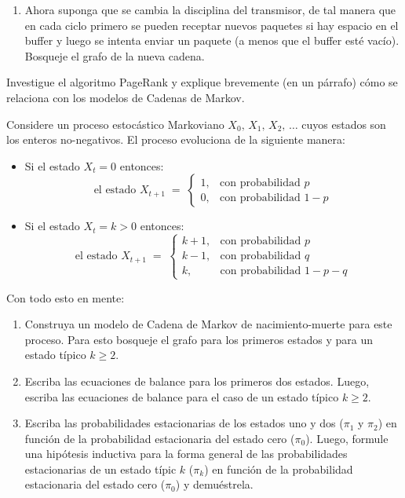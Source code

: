 \documentclass[ a4paper, twoside, 11pt]{article}
\begin{document}
\begin{problem}
\begin{enumerate}[label=\textbf{\alph*)}]
\item Ahora suponga que se cambia la disciplina del transmisor, de tal manera que en cada ciclo primero se pueden receptar nuevos paquetes si hay espacio en el buffer y luego se intenta enviar un paquete (a menos que el buffer est\'e vac\'io). Bosqueje el grafo de la nueva cadena. 

\end{enumerate}

\end{problem}
\fullskip

\begin{problem}
Investigue el algoritmo PageRank y explique brevemente (\eg en un p\'arrafo) c\'omo se relaciona con los modelos de Cadenas de Markov. \QED

\end{problem}
\fullskip

\begin{problem}
Considere un proceso estoc\'astico Markoviano $X_0, \, X_1, \, X_2,\, \dots$ cuyos estados son los enteros no-negativos. El proceso evoluciona de la siguiente manera: 
\begin{itemize}
\item Si el estado $X_t = 0$ entonces: 
\[
\text{el estado } X_{t+1} \; = \; 
\begin{cases}
1, & \text{con probabilidad } p \\
0, & \text{con probabilidad } 1-p 
\end{cases}
\]
\item Si el estado $X_t = k > 0$ entonces: 
\[
\text{el estado } X_{t+1} \; = \; 
\begin{cases}
k+1, & \text{con probabilidad } p \\
k-1, & \text{con probabilidad } q \\
k, & \text{con probabilidad } 1-p-q
\end{cases}
\]
\end{itemize}

Con todo esto en mente: 
\begin{enumerate}[label=\textbf{\alph*)}]
\item Construya un modelo de Cadena de Markov de nacimiento-muerte para este proceso. Para esto bosqueje el grafo para los primeros estados y para un estado t\'ipico $k \geq 2$. 
\item Escriba las ecuaciones de balance para los primeros dos estados. Luego, escriba las ecuaciones de balance para el caso de un estado t\'ipico $k \geq 2$. 
\item Escriba las probabilidades estacionarias de los estados uno y dos (\ie $ \pi_1$ y $\pi_2$) en funci\'on de la probabilidad estacionaria del estado cero ($\pi_0$). Luego, formule una hip\'otesis inductiva para la forma general de las probabilidades estacionarias de un estado t\'ipic $k$ ($\pi_k$) en funci\'on de la probabilidad estacionaria del estado cero ($\pi_0$) y demu\'estrela. 
\end{enumerate}
\QED

\end{problem}
\fullskip
\end{document}
